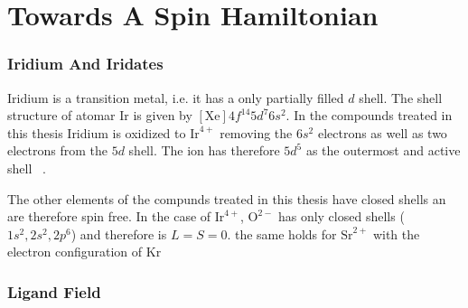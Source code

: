 \documentclass[a4paper,10pt]{report}
\begin{document}
  

\chapter{Towards A Spin Hamiltonian}

\subsection{Iridium And Iridates}
Iridium is a transition metal, i.e. it has a only partially filled $d$ shell.  
The shell structure of atomar Ir is given by $[\mathrm{Xe}]4f^{14}5d^7 6s^2$.
In the compounds treated in this thesis Iridium is oxidized to $\mathrm{Ir}^{4+}$ 
removing the $6s^2$ electrons as well as two electrons from the $5d$ shell. 
The ion has therefore $5d^5$ as the outermost and active shell ~\cite{Abragam70}.


The other elements of the compunds treated in this thesis have closed shells an are therefore spin free. In the case of $\mathrm{Ir}^{4+}$, 
$\mathrm{O}^{2-}$ has only closed shells ($1s^2,2s^2,2p^6$) and therefore is $L=S=0$.
the same holds for $\mathrm{Sr}^{2+}$ with the electron configuration of $\mathrm{Kr}$

\subsection{Ligand Field}
\end{document}
